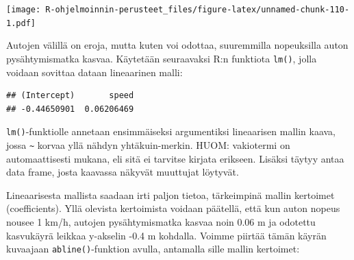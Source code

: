 \documentclass[
]{book}
\newenvironment{Shaded}{\begin{snugshade}}{\end{snugshade}}
\newcommand{\AttributeTok}[1]{\textcolor[rgb]{0.77,0.63,0.00}{#1}}
\newcommand{\CommentTok}[1]{\textcolor[rgb]{0.56,0.35,0.01}{\textit{#1}}}
\newcommand{\FloatTok}[1]{\textcolor[rgb]{0.00,0.00,0.81}{#1}}
\newcommand{\FunctionTok}[1]{\textcolor[rgb]{0.00,0.00,0.00}{#1}}
\newcommand{\NormalTok}[1]{#1}
\newcommand{\OtherTok}[1]{\textcolor[rgb]{0.56,0.35,0.01}{#1}}
\newcommand{\SpecialCharTok}[1]{\textcolor[rgb]{0.00,0.00,0.00}{#1}}
\newcommand{\StringTok}[1]{\textcolor[rgb]{0.31,0.60,0.02}{#1}}
\begin{document}
\begin{Shaded}
\end{Shaded}

\texttt{[image: R-ohjelmoinnin-perusteet\_files/figure-latex/unnamed-chunk-110-1.pdf]}

Autojen välillä on eroja, mutta kuten voi odottaa, suuremmilla nopeuksilla auton pysähtymismatka kasvaa. Käytetään seuraavaksi R:n funktiota \texttt{lm()}, jolla voidaan sovittaa dataan lineaarinen malli:

\begin{Shaded}
\end{Shaded}

\begin{verbatim}
## (Intercept)       speed 
## -0.44650901  0.06206469
\end{verbatim}

\texttt{lm()}-funktiolle annetaan ensimmäiseksi argumentiksi lineaarisen mallin kaava, jossa \texttt{\textasciitilde{}} korvaa yllä nähdyn yhtäkuin-merkin. HUOM: vakiotermi on automaattisesti mukana, eli sitä ei tarvitse kirjata erikseen. Lisäksi täytyy antaa data frame, josta kaavassa näkyvät muuttujat löytyvät.

Lineaarisesta mallista saadaan irti paljon tietoa, tärkeimpinä mallin kertoimet (coefficients). Yllä olevista kertoimista voidaan päätellä, että kun auton nopeus nousee 1 km/h, autojen pysähtymismatka kasvaa noin 0.06 m ja odotettu kasvukäyrä leikkaa y-akselin -0.4 m kohdalla. Voimme piirtää tämän käyrän kuvaajaan \texttt{abline()}-funktion avulla, antamalla sille mallin kertoimet:
\end{document}
